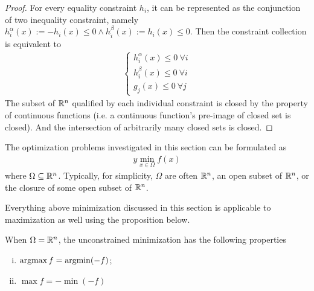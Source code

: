 \documentclass{article}
\begin{document}
	\begin{proof}
		For every equality constraint $h_i$, it can be represented as the conjunction of two inequality constraint, namely $h_i^\alpha (x) := -h_i(x) \leq 0 \land h_i^\beta (x) := h_i(x) \leq 0$. Then the constraint collection is equivalent to
		\begin{align}
			\begin{cases}
				h_i^\alpha (x) \leq 0\ \forall i \\
				h_i^\beta (x) \leq 0\ \forall i \\
				g_j(x) \leq 0\ \forall j
			\end{cases}
		\end{align}
		The subset of $\mathbb{R}^n$ qualified by each individual constraint is closed by the property of continuous functions (i.e. a continuous function's pre-image of closed set is closed). And the intersection of arbitrarily many closed sets is closed.
	\end{proof}
	
    

    \par The optimization problems investigated in this section can be formulated as
    \begin{align} y
    	\min_{x \in \Omega} f(x)
    \end{align}
    where $\Omega \subseteq \mathbb{R}^n$. Typically, for simplicity, $\Omega$ are often $\mathbb{R}^n$, an open subset of $\mathbb{R}^n$, or the closure of some open subset of $\mathbb{R}^n$.
    \par Everything above minimization discussed in this section is applicable to maximization as well using the proposition below.

    \begin{proposition}
        When $\Omega = \mathbb{R}^n$, the unconstrained minimization has the following properties
        \begin{enumerate}[(i)]
            \item $\operatorname*{argmax} f = \operatorname*{argmin} (-f)$;
            \item $\max f = - \min (-f)$
        \end{enumerate}
    \end{proposition}
    
\end{document}
